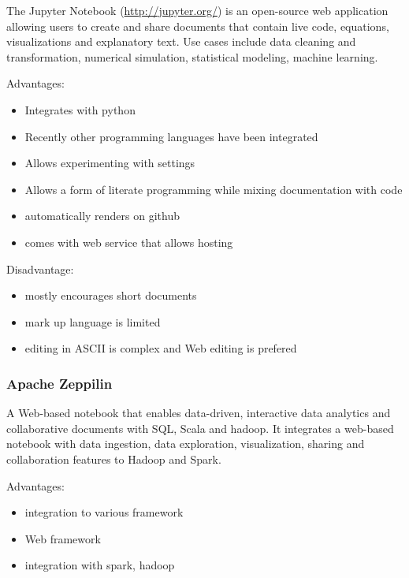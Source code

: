 The Jupyter Notebook (\url{http://jupyter.org/}) is an open-source web
application allowing users to create and share documents that contain
live code, equations, visualizations and explanatory text. Use cases
include data cleaning and transformation, numerical simulation,
statistical modeling, machine learning.

Advantages:

\begin{itemize}
\tightlist
\item
  Integrates with python
\item
  Recently other programming languages have been integrated
\item
  Allows experimenting with settings
\item
  Allows a form of literate programming while mixing documentation with
  code
\item
  automatically renders on github
\item
  comes with web service that allows hosting
\end{itemize}

Disadvantage:

\begin{itemize}
\tightlist
\item
  mostly encourages short documents
\item
  mark up language is limited
\item
  editing in ASCII is complex and Web editing is prefered
\end{itemize}

\subsubsection{Apache Zeppilin}\label{apache-zeppilin}

A Web-based notebook that enables data-driven, interactive data
analytics and collaborative documents with SQL, Scala and hadoop. It
integrates a web-based notebook with data ingestion, data exploration,
visualization, sharing and collaboration features to Hadoop and Spark.

Advantages:

\begin{itemize}
\tightlist
\item
  integration to various framework
\item
  Web framework
\item
  integration with spark, hadoop
\end{itemize}

